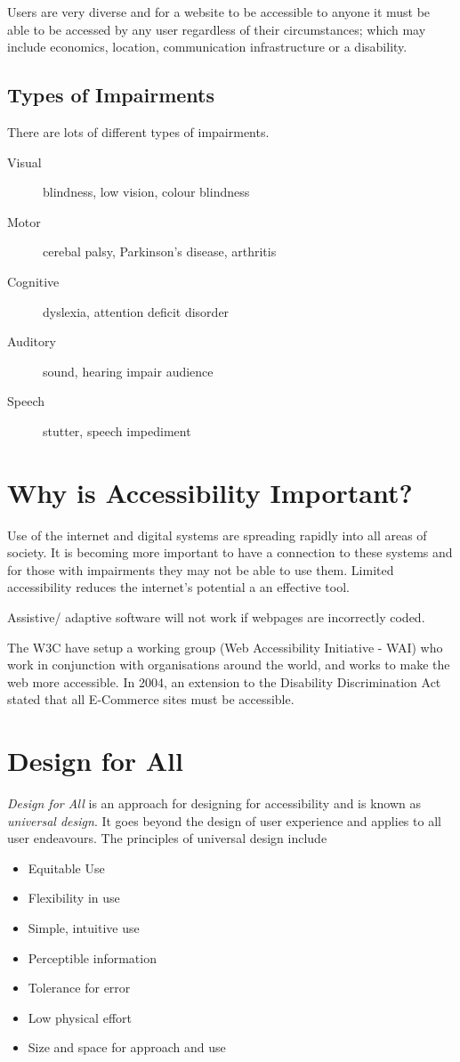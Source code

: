 Users are very diverse and for a website to be accessible to anyone it must be able to be accessed by any user regardless of their circumstances; which may include economics, location, communication infrastructure or a disability.

\subsection{Types of Impairments}
There are lots of different types of impairments.
\begin{description}
    \item[Visual] blindness, low vision, colour blindness
    \item[Motor] cerebal palsy, Parkinson's disease, arthritis
    \item[Cognitive] dyslexia, attention deficit disorder
    \item[Auditory] sound, hearing impair audience
    \item[Speech] stutter, speech impediment
\end{description}


\section{Why is Accessibility Important?}
Use of the internet and digital systems are spreading rapidly into all areas of society. It is becoming more important to have a connection to these systems and for those with impairments they may not be able to use them. Limited accessibility reduces the internet's potential a an effective tool.

Assistive/ adaptive software will not work if webpages are incorrectly coded. 

The W3C have setup a working group (Web Accessibility Initiative - WAI) who work in conjunction with organisations around the world, and works to make the web more accessible. In 2004, an extension to the Disability Discrimination Act stated that all E-Commerce sites must be accessible.

\section{Design for All}
\textit{Design for All} is an approach for designing for accessibility and is known as \textit{universal design}. It goes beyond the design of user experience and applies to all user endeavours. The principles of universal design include
\begin{itemize}
    \item Equitable Use
    \item Flexibility in use
    \item Simple, intuitive use
    \item Perceptible information
    \item Tolerance for error
    \item Low physical effort
    \item Size and space for approach and use
\end{itemize}

